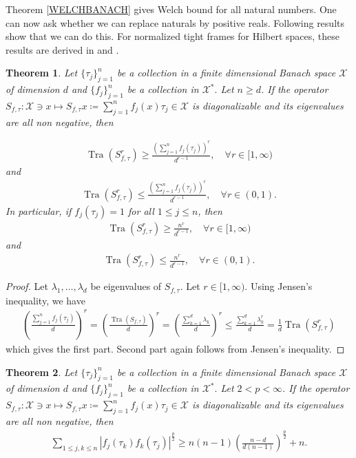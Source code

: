 \documentclass{amsart}
\newtheorem{theorem}{Theorem}[section]
\begin{document}
  
  
 
  Theorem \ref{WELCHBANACH} gives Welch bound for all natural numbers. One can now ask whether we can replace naturals by positive reals. Following results show that we can do this.   For normalized tight frames for Hilbert spaces, these results are  derived in \cite{HAIKINZAMIRGAVISH} and   \cite{EHLEROKOUDJOU}.
  \begin{theorem}\label{DISCRETEARBITRARY1}
 	Let $\{\tau_j\}_{j=1}^n$ be a collection in a finite dimensional Banach space $\mathcal{X}$ of dimension $d$  and 	$\{f_j\}_{j=1}^n$ be a collection in  $\mathcal{X}^*.$ Let $n\geq d$. If the  operator 
 $	S_{f, \tau}:\mathcal{X}\ni x \mapsto S_{f, \tau}x\coloneqq \sum_{j=1}^n
 f_j(x)\tau_j \in
 \mathcal{X}$ is diagonalizable and its eigenvalues are all non negative, then  
 
 \begin{align*}
 \operatorname{Tra}(S^r_{f,\tau})\geq \frac{\left(\sum_{j=1}^n
 	f_j(\tau_j)\right)^r}{d^{r-1}},\quad \forall r \in [1, \infty)
 \end{align*}
and 
 \begin{align*}
	\operatorname{Tra}(S^r_{f,\tau})\leq \frac{\left(\sum_{j=1}^n
		f_j(\tau_j)\right)^r}{d^{r-1}},\quad \forall r \in (0,1).
\end{align*}
 In particular, if $f_j(\tau_j)=1$ for all $1\leq j \leq n$, then 
 \begin{align*}
\operatorname{Tra}(S^r_{f,\tau})\geq \frac{n^r}{d^{r-1}}, \quad \forall r \in [1, \infty)
\end{align*} 	
and 
 \begin{align*}
	\operatorname{Tra}(S^r_{f,\tau})\leq \frac{n^r}{d^{r-1}},\quad \forall r \in (0,1).
\end{align*} 	
 \end{theorem}
\begin{proof}
	Let $\lambda_1, \dots, \lambda_d$ be eigenvalues of $	S_{f, \tau}$. Let $r \in [1, \infty)$.	Using Jensen's inequality, we have 
	\begin{align*}
	\left(\frac{\sum_{j=1}^n
		f_j(\tau_j)}{d}\right)^r=\left(\frac{\operatorname{Tra}(S_{f,\tau})}{d}\right)^r=\left(\frac{\sum_{k=1}^{d}\lambda_k}{d}\right)^r\leq \frac{\sum_{k=1}^{d}\lambda_k^r}{d}=\frac{1}{d}\operatorname{Tra}(S^r_{f,\tau})
	\end{align*}
	which gives the first part. Second part again follows from Jensen's inequality.
\end{proof}
\begin{theorem}\label{DISCRETEARBITRARY2}
		Let $\{\tau_j\}_{j=1}^n$ be a collection in a finite dimensional Banach space $\mathcal{X}$ of dimension $d$  and 	$\{f_j\}_{j=1}^n$ be a collection in  $\mathcal{X}^*.$  Let $2<p<\infty$. If the  operator 
	$	S_{f, \tau}:\mathcal{X}\ni x \mapsto S_{f, \tau}x\coloneqq \sum_{j=1}^n
	f_j(x)\tau_j \in
	\mathcal{X}$ is diagonalizable and its eigenvalues are all non negative, then  
	\begin{align*}
		 \sum_{1\leq j,k \leq n}|f_j(\tau_k)f_k(\tau_j)|^\frac{p}{2} \geq n(n-1)\left(\frac{n-d}{d(n-1)}\right)^\frac{p}{2}+n.
	\end{align*}
\end{theorem}
\end{document}
